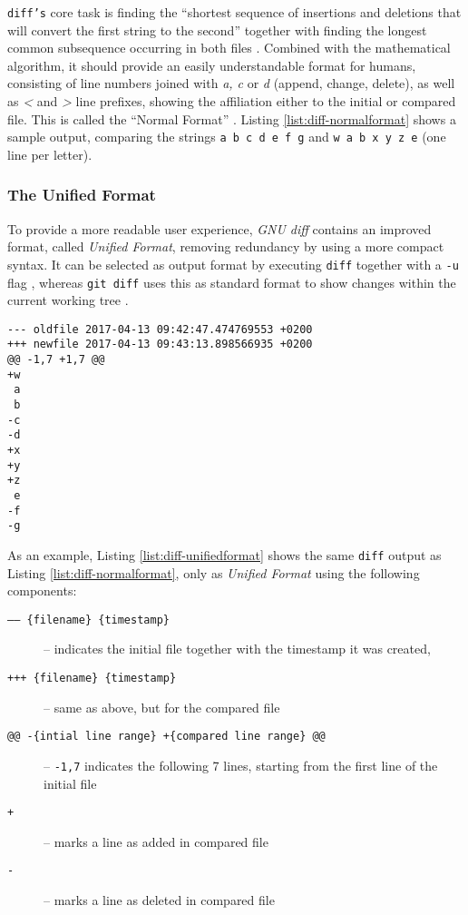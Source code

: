 \texttt{diff's} core task is finding the ``shortest sequence of insertions and deletions that will convert the first string to the second'' \cite[1025]{miller1985file} together with finding the longest common subsequence occurring in both files \cite[2]{Hunt1976}. Combined with the mathematical algorithm, it should provide an easily understandable format for humans, consisting of line numbers joined with \emph{a, c} or \emph{d} (append, change, delete), as well as \emph{<} and \emph{>} line prefixes, showing the affiliation either to the initial or compared file. This is called the ``Normal Format'' \cite[12]{mackenzie2003comparing}. Listing \ref{list:diff-normalformat} shows a sample output, comparing the strings \texttt{a b c d e f g} and \texttt{w a b x y z e} (one line per letter)\cite[p. 1f]{Hunt1976}.


\vspace{20pt}
\subsubsection{The Unified Format}

To provide a more readable user experience, \emph{GNU diff} contains an improved format, called \emph{Unified Format}, removing redundancy by using a more compact syntax. It can be selected as output format by executing \texttt{diff} together with a \texttt{-u} flag \cite[16]{mackenzie2003comparing}, whereas \texttt{git diff} uses this as standard format to show changes within the current working tree \cite{GitDiff}.


\begin{lstlisting}[label={list:diff-unifiedformat}, caption=unified\_format.diff]
--- oldfile	2017-04-13 09:42:47.474769553 +0200
+++ newfile	2017-04-13 09:43:13.898566935 +0200
@@ -1,7 +1,7 @@
+w
 a
 b
-c
-d
+x
+y
+z
 e
-f
-g
\end{lstlisting}

As an example, Listing \ref{list:diff-unifiedformat} shows the same \texttt{diff} output as Listing \ref{list:diff-normalformat}, only as \emph{Unified Format} using the following components:

\begin{description}
  \item[\texttt{------ \{filename\} \{timestamp\}}] -- indicates the initial file together with the timestamp it was created,
  \item[\texttt{+++ \{filename\} \{timestamp\}}] -- same as above, but for the compared file
  \item[\texttt{@@ -\{intial line range\} +\{compared line range\} @@}] -- \texttt{-1,7} indicates the following 7 lines, starting from the first line of the initial file
  \item[\texttt{+}] -- marks a line as added in compared file
  \item[\texttt{-}] -- marks a line as deleted in compared file
\end{description}

